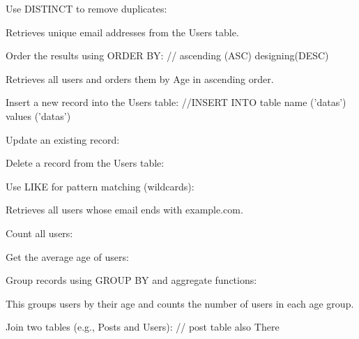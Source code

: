 Use DISTINCT to remove {duplicates}:


Retrieves unique email addresses from the Users table.

Order the results using {ORDER BY:} // ascending (ASC) designing(DESC)


Retrieves all users and orders them by Age in ascending order.


{Insert} a new record into the Users table: //INSERT INTO table name ('datas') values ('datas')


{Update} an existing record:



{Delete} a record from the Users table:


Use LIKE for pattern matching (wildcards):



Retrieves all users whose email ends with example.com.





Count all users:


Get the average age of users:


Group records using GROUP BY and aggregate functions:



This groups users by their age and counts the number of users in each age group.

Join two tables (e.g.,{ Posts} and Users): // post table also There


